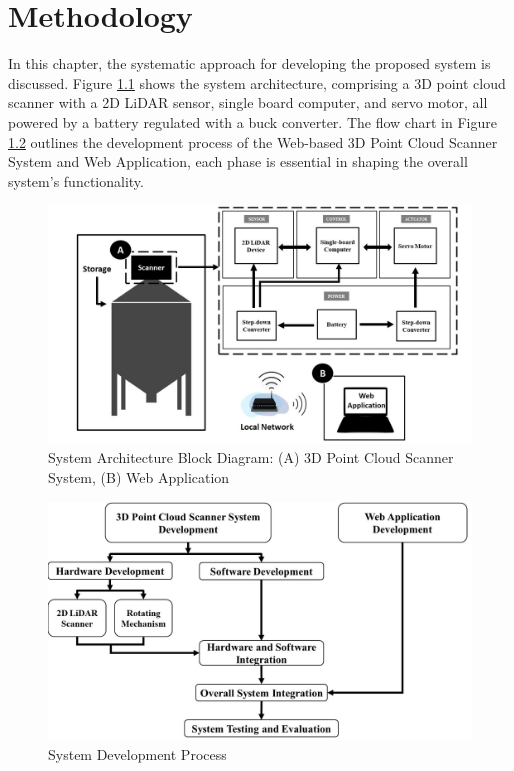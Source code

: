 \renewcommand{\thechapter}{\Roman{chapter}}
\chapter{Methodology}
\renewcommand{\thechapter}{\arabic{chapter}}
\label{ch3:Methodology}
\thispagestyle{empty}

In this chapter, the systematic approach for developing the proposed system is discussed. Figure \ref{ch3:fig:system-architecture} shows the system architecture, comprising a 3D point cloud scanner with a 2D LiDAR sensor, single board computer, and servo motor, all powered by a battery regulated with a buck converter. The flow chart in Figure \ref{ch3:fig:system_development_process} outlines the development process of the Web-based 3D Point Cloud Scanner System and Web Application, each phase is essential in shaping the overall system's functionality. \\
\begin{figure}[H]
	\centering
	\includegraphics[width=1\textwidth]{Figures/system architecture}
	\caption{System Architecture Block Diagram: (A) 3D Point Cloud Scanner System, (B) Web Application}
	\label{ch3:fig:system-architecture}
\end{figure}

\begin{figure}[H]
	\centering
	\includegraphics[width=1\textwidth]{Figures/system_development_process}
	\caption{System Development Process}
	\label{ch3:fig:system_development_process}
\end{figure}

